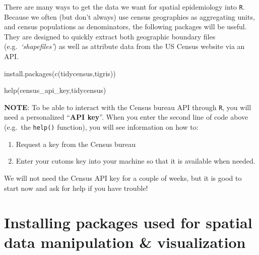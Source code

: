 \documentclass[
]{book}
\newenvironment{Shaded}{\begin{snugshade}}{\end{snugshade}}
\newcommand{\FunctionTok}[1]{\textcolor[rgb]{0.00,0.00,0.00}{#1}}
\newcommand{\NormalTok}[1]{#1}
\newcommand{\StringTok}[1]{\textcolor[rgb]{0.31,0.60,0.02}{#1}}
\providecommand{\tightlist}{%
  \setlength{\itemsep}{0pt}\setlength{\parskip}{0pt}}
\newenvironment{rmdtip}[1]
  {
  \begin{itemize}
  \renewcommand{\labelitemi}{
    \raisebox{-.7\height}[0pt][0pt]{
      {\setkeys{Gin}{width=3em,keepaspectratio}\texttt{[image: images/\#1]}}
    }
  }
  \setlength{\fboxsep}{1em}
  \begin{tip}
  \item
  }
  {
  \end{tip}
  \end{itemize}
  }
\begin{document}
There are many ways to get the data we want for spatial epidemiology into \texttt{R}. Because we often (but don't always) use census geographies as aggregating units, and census populations as denominators, the following packages will be useful. They are designed to quickly extract both geographic boundary files (e.g.~\emph{`shapefiles'}) as well as attribute data from the US Census website via an API.

\begin{Shaded}
\begin{Highlighting}[]
\FunctionTok{install.packages}\NormalTok{(}\FunctionTok{c}\NormalTok{(}\StringTok{\textquotesingle{}tidycensus\textquotesingle{}}\NormalTok{,}\StringTok{\textquotesingle{}tigris\textquotesingle{}}\NormalTok{)) }

\FunctionTok{help}\NormalTok{(}\StringTok{\textquotesingle{}census\_api\_key\textquotesingle{}}\NormalTok{,}\StringTok{\textquotesingle{}tidycensus\textquotesingle{}}\NormalTok{)}
\end{Highlighting}
\end{Shaded}

\begin{rmdtip}{tip}
\textbf{NOTE}: To be able to interact with the Census bureau API through \texttt{R}, you will need a personalized ``\textbf{API key}''. When you enter the second line of code above (e.g.~the \texttt{help()} function), you will see information on how to:

\begin{enumerate}
\def\labelenumi{\arabic{enumi}.}
\tightlist
\item
  Request a key from the Census bureau
\item
  Enter your cutoms key into your machine so that it is available when needed.
\end{enumerate}

We will not need the Census API key for a couple of weeks, but it is good to start now and ask for help if you have trouble!

\end{rmdtip}

\hypertarget{installing-packages-used-for-spatial-data-manipulation-visualization}{%
\section*{Installing packages used for spatial data manipulation \& visualization}\label{installing-packages-used-for-spatial-data-manipulation-visualization}}
\end{document}
